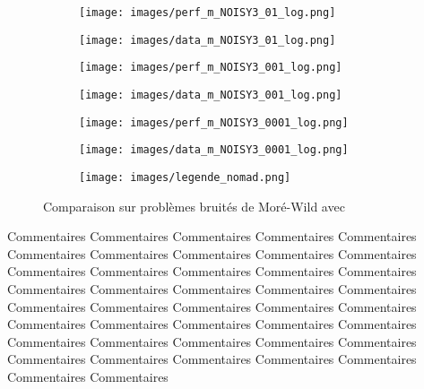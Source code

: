 			\begin{figure}[!htb] %
				\centering
				\begin{subfigure}{0.43\textwidth}
					\texttt{[image: images/perf\_m\_NOISY3\_01\_log.png]}
				\end{subfigure}%
				\begin{subfigure}{0.43\textwidth}
					\texttt{[image: images/data\_m\_NOISY3\_01\_log.png]}
				\end{subfigure}
				\smallskip
				\begin{subfigure}{0.43\textwidth}
					\texttt{[image: images/perf\_m\_NOISY3\_001\_log.png]}
				\end{subfigure}%
				\begin{subfigure}{0.43\textwidth}
					\texttt{[image: images/data\_m\_NOISY3\_001\_log.png]}
				\end{subfigure}
				\smallskip
				\begin{subfigure}{0.43\textwidth}
					\texttt{[image: images/perf\_m\_NOISY3\_0001\_log.png]}
				\end{subfigure}%
				\begin{subfigure}{0.43\textwidth}
					\texttt{[image: images/data\_m\_NOISY3\_0001\_log.png]}
				\end{subfigure}
				\smallskip
				\begin{subfigure}{0.95\textwidth}
					\texttt{[image: images/legende\_nomad.png]}
				\end{subfigure}
				\caption{Comparaison sur problèmes bruités de Moré-Wild avec \CS} \label{fig:3}
			\end{figure}
			\clearpage
			Commentaires Commentaires Commentaires Commentaires Commentaires Commentaires Commentaires Commentaires Commentaires Commentaires Commentaires Commentaires Commentaires Commentaires Commentaires Commentaires Commentaires Commentaires Commentaires Commentaires Commentaires Commentaires Commentaires Commentaires Commentaires Commentaires Commentaires Commentaires Commentaires Commentaires Commentaires Commentaires Commentaires Commentaires Commentaires Commentaires Commentaires Commentaires Commentaires Commentaires Commentaires Commentaires 
			\clearpage
